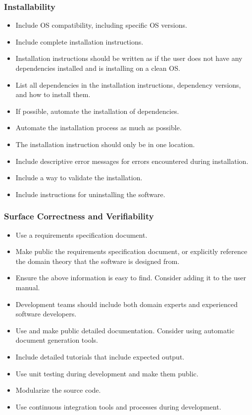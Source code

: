 \documentclass[12pt, notitlepage]{article}
\begin{document}
\subsubsection{Installability}

\begin{itemize}
	\item Include OS compatibility, including specific OS versions.
	\item Include complete installation instructions.
	\item Installation instructions should be written as if the user does not have any dependencies installed and is installing on a clean OS.
	\item List all dependencies in the installation instructions, dependency versions, and how to install them.
	\item If possible, automate the installation of dependencies.
	\item Automate the installation process as much as possible.
	\item The installation instruction should only be in one location.
	\item Include descriptive error messages for errors encountered during installation.
	\item Include a way to validate the installation.
	\item Include instructions for uninstalling the software.
\end{itemize}

\subsubsection{Surface Correctness and Verifiability}

\begin{itemize}
	\item Use a requirements specification document.
	\item Make public the requirements specification document, or explicitly reference the domain theory that the software is designed from.
	\item Ensure the above information is easy to find. Consider adding it to the user manual. 
	\item Development teams should include both domain experts and experienced software developers.
	\item Use and make public detailed documentation. Consider using automatic document generation tools.
	\item Include detailed tutorials that include expected output.
	\item Use unit testing during development and make them public.
	\item Modularize the source code.
	\item Use continuous integration tools and processes during development.
\end{itemize}
\end{document}

